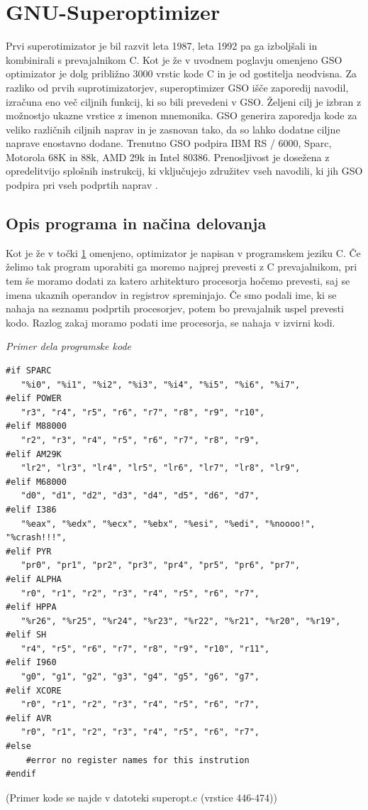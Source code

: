 \documentclass[a4paper, 12pt]{book}
\begin{document}
\chapter{GNU-Superoptimizer}
\label{ch2}
Prvi superotimizator je bil razvit leta 1987, leta 1992 pa ga izboljšali in  kombinirali s prevajalnikom C. Kot je že v uvodnem poglavju omenjeno GSO optimizator je dolg približno 3000 vrstic kode C in je od gostitelja neodvisna. Za razliko od prvih suprotimizatorjev, superoptimizer GSO išče zaporedij navodil, izračuna eno več ciljnih funkcij, ki so bili prevedeni v GSO. Željeni cilj je izbran z možnostjo ukazne vrstice z imenon mnemonika. GSO generira zaporedja kode za veliko različnih ciljnih naprav in je zasnovan tako, da so lahko dodatne ciljne naprave enostavno dodane. Trenutno GSO podpira IBM RS / 6000, Sparc, Motorola 68K in 88k, AMD 29k in Intel 80386. Prenosljivost je dosežena z opredelitvijo splošnih instrukcij, ki vključujejo združitev vseh navodili, ki jih GSO podpira pri vseh podprtih naprav \cite{url1}.

\section{Opis programa in načina delovanja}
	\label{prev}
	Kot je že v točki \ref{ch2} omenjeno, optimizator je napisan v programskem jeziku C. Če želimo tak program uporabiti ga moremo najprej prevesti z C prevajalnikom, pri tem še moramo dodati za katero arhitekturo procesorja hočemo prevesti, saj se imena ukaznih operandov in registrov spreminjajo. Če smo podali ime, ki se nahaja na seznamu podprtih procesorjev, potem bo prevajalnik uspel prevesti kodo. Razlog zakaj moramo podati ime procesorja, se nahaja v izvirni kodi.
	
	\medskip
	
	\noindent
	{\it Primer dela programske kode}
\begin{Verbatim}[baselinestretch=1]
#if SPARC
   "%i0", "%i1", "%i2", "%i3", "%i4", "%i5", "%i6", "%i7",
#elif POWER
   "r3", "r4", "r5", "r6", "r7", "r8", "r9", "r10",
#elif M88000
   "r2", "r3", "r4", "r5", "r6", "r7", "r8", "r9",
#elif AM29K
   "lr2", "lr3", "lr4", "lr5", "lr6", "lr7", "lr8", "lr9",
#elif M68000
   "d0", "d1", "d2", "d3", "d4", "d5", "d6", "d7",
#elif I386
   "%eax", "%edx", "%ecx", "%ebx", "%esi", "%edi", "%noooo!", "%crash!!!",
#elif PYR
   "pr0", "pr1", "pr2", "pr3", "pr4", "pr5", "pr6", "pr7",
#elif ALPHA
   "r0", "r1", "r2", "r3", "r4", "r5", "r6", "r7",
#elif HPPA
   "%r26", "%r25", "%r24", "%r23", "%r22", "%r21", "%r20", "%r19",
#elif SH
   "r4", "r5", "r6", "r7", "r8", "r9", "r10", "r11",
#elif I960
   "g0", "g1", "g2", "g3", "g4", "g5", "g6", "g7",
#elif XCORE
   "r0", "r1", "r2", "r3", "r4", "r5", "r6", "r7",
#elif AVR
   "r0", "r1", "r2", "r3", "r4", "r5", "r6", "r7",
#else
	#error no register names for this instrution
#endif
\end{Verbatim}
	\noindent
	{\small (Primer kode se najde v datoteki superopt.c (vrstice 446-474))}
	
\end{document}
